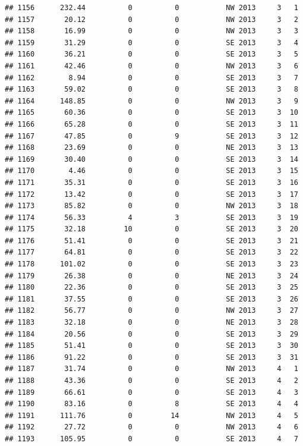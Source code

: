 \documentclass[
]{article}
\begin{document}
\begin{verbatim}
## 1156      232.44          0          0           NW 2013     3   1
## 1157       20.12          0          0           NW 2013     3   2
## 1158       16.99          0          0           NW 2013     3   3
## 1159       31.29          0          0           SE 2013     3   4
## 1160       36.21          0          0           SE 2013     3   5
## 1161       42.46          0          0           NW 2013     3   6
## 1162        8.94          0          0           SE 2013     3   7
## 1163       59.02          0          0           SE 2013     3   8
## 1164      148.85          0          0           NW 2013     3   9
## 1165       60.36          0          0           SE 2013     3  10
## 1166       65.28          0          0           SE 2013     3  11
## 1167       47.85          0          9           SE 2013     3  12
## 1168       23.69          0          0           NE 2013     3  13
## 1169       30.40          0          0           SE 2013     3  14
## 1170        4.46          0          0           SE 2013     3  15
## 1171       35.31          0          0           SE 2013     3  16
## 1172       13.42          0          0           SE 2013     3  17
## 1173       85.82          0          0           NW 2013     3  18
## 1174       56.33          4          3           SE 2013     3  19
## 1175       32.18         10          0           SE 2013     3  20
## 1176       51.41          0          0           SE 2013     3  21
## 1177       64.81          0          0           SE 2013     3  22
## 1178      101.02          0          0           SE 2013     3  23
## 1179       26.38          0          0           NE 2013     3  24
## 1180       22.36          0          0           SE 2013     3  25
## 1181       37.55          0          0           SE 2013     3  26
## 1182       56.77          0          0           NW 2013     3  27
## 1183       32.18          0          0           NE 2013     3  28
## 1184       20.56          0          0           SE 2013     3  29
## 1185       51.41          0          0           SE 2013     3  30
## 1186       91.22          0          0           SE 2013     3  31
## 1187       31.74          0          0           NW 2013     4   1
## 1188       43.36          0          0           SE 2013     4   2
## 1189       66.61          0          0           SE 2013     4   3
## 1190       83.16          0          8           SE 2013     4   4
## 1191      111.76          0         14           NW 2013     4   5
## 1192       27.72          0          0           NW 2013     4   6
## 1193      105.95          0          0           SE 2013     4   7

\end{verbatim}
\end{document}
